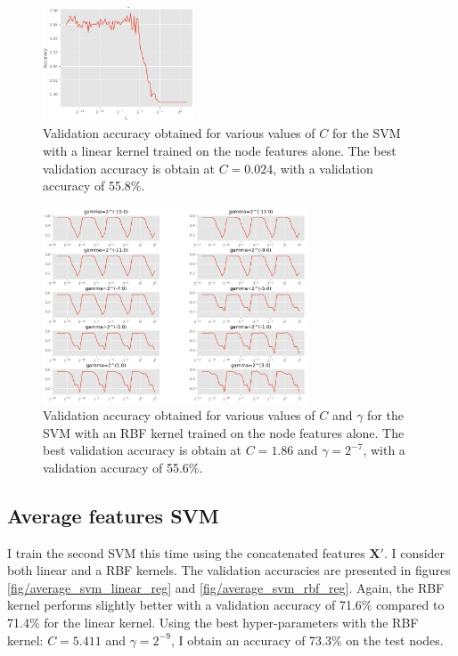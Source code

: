 \documentclass[12pt]{article}
\theoremstyle{definition}
\begin{document}
\begin{figure}[H]
	\includegraphics[width=0.4\textwidth]{node_svm/linear_reg}
	\centering
	\caption{Validation accuracy obtained for various values of $C$ for the SVM with a linear kernel trained on the node features alone. The best validation accuracy is obtain at $C=0.024$, with a validation accuracy of 55.8\%.}
	\label{fig/node_svm_linear_reg}
\end{figure}
\begin{figure}[H]
	\includegraphics[width=0.7\textwidth]{node_svm/rbf_reg}
	\centering
	\caption{Validation accuracy obtained for various values of $C$ and $\gamma$ for the SVM with an RBF kernel trained on the node features alone. The best validation accuracy is obtain at $C=1.86$ and $\gamma=2^{-7}$, with a validation accuracy of 55.6\%.}
	\label{fig/node_svm_rbf_reg}
\end{figure}

\subsection{Average features SVM}
I train the second SVM this time using the concatenated features $\mathbf{X}'$. I consider both linear and a RBF kernels. The validation accuracies are presented in figures \ref{fig/average_svm_linear_reg} and \ref{fig/average_svm_rbf_reg}. Again, the RBF kernel performs slightly better with a validation accuracy of 71.6\% compared to 71.4\% for the linear kernel. Using the best hyper-parameters with the RBF kernel: $C=5.411$ and $\gamma = 2^{-9}$, I obtain an accuracy of 73.3\% on the test nodes.
\end{document}
